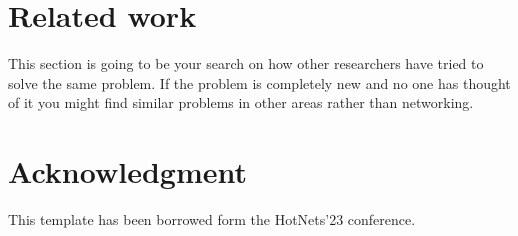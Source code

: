 \documentclass{hotnets23}
\begin{document}
\section*{Related work}

This section is going to be your search on how other researchers have tried to solve the same problem. If the problem is completely new and no one has thought of it you might find similar problems in other areas rather than networking.

\section*{Acknowledgment}
This template has been borrowed form the HotNets'23 conference.  

 
\begin{small}

\end{small}
\end{document}
